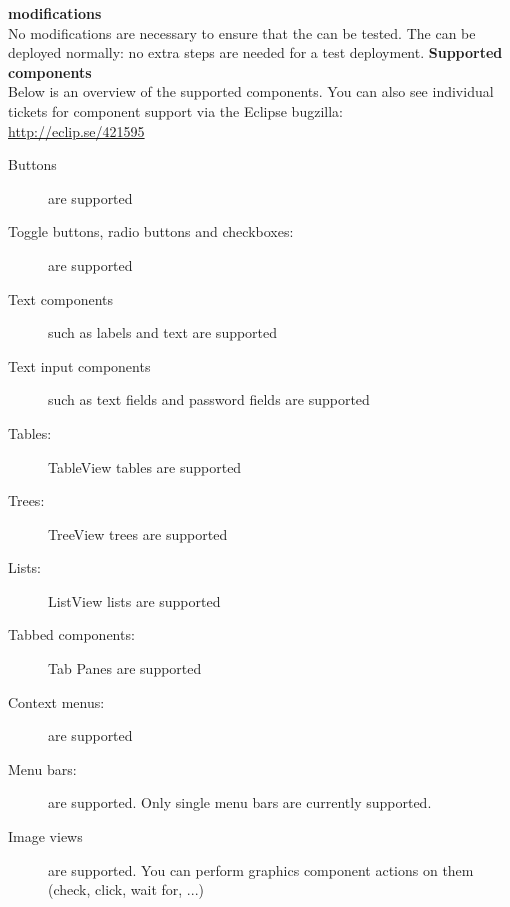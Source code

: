 \textbf{\gdaut{} modifications}\\
No modifications are necessary to ensure that the \gdaut{} can be tested. The \gdaut{} can be deployed normally: no extra steps are needed for a test deployment.
\textbf{Supported components}\\
Below is an overview of the supported components. You can also see individual tickets for component support via the Eclipse bugzilla:\\
\url{http://eclip.se/421595}
\begin{description}
\item [Buttons]{are supported}
\item [Toggle buttons, radio buttons and checkboxes:]{are supported}
\item [Text components]{such as labels and text are supported}
\item [Text input components]{such as text fields and password fields are supported}
\item [Tables:]{TableView tables are supported}
\item [Trees:]{TreeView trees are supported}
\item [Lists:]{ListView lists are supported}
\item [Tabbed components:]{Tab Panes are supported}
\item [Context menus:]{are supported}
\item [Menu bars:]{are supported. Only single menu bars are currently supported.}
\item [Image views]{are supported. You can perform graphics component actions on them (check, click, wait for, ...)}
\end{description}
